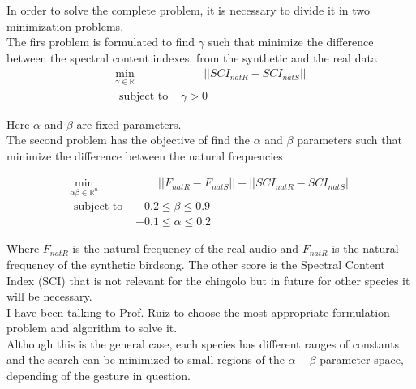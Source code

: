 \documentclass{article}
\begin{document}
    
    In order to solve the complete problem, it is necessary to divide it in two minimization problems.\\
    
    The firs problem is formulated to find $\gamma$ such that minimize the difference between the  spectral content indexes, from the synthetic and the real data
    \begin{equation}
    \begin{aligned}
    \underset{\gamma \in \mathbb{R}}{\text{min}} &\qquad || SCI_{natR} - SCI_{natS}||\\
    \text { subject to } &  \gamma > 0
    \end{aligned}
    \end{equation}
    
    Here $\alpha$ and $\beta$ are fixed parameters.\\
    
    The second problem has the objective of find the $\alpha$ and $\beta$ parameters such that minimize the difference between the natural frequencies
    
    \begin{equation}
    \begin{aligned}
    \underset{\alpha \beta \in \mathbb{R}^n}{\text{min}} &\qquad || F_{natR} - F_{natS}|| + || SCI_{natR} - SCI_{natS}||\\
    \text { subject to } & -0.2\leq\beta \leq 0.9\\
     & -0.1 \leq \alpha \leq 0.2
    \end{aligned}
    \end{equation}
    
    
    Where $F_{natR}$ is the natural frequency of the real audio and $F_{natR}$ is the natural frequency of the synthetic birdsong. The other score is the Spectral Content Index (SCI) that is not relevant for the chingolo but in future for other species it will be necessary.\\
    
    
    
    I have been talking to Prof. Ruiz to choose the most appropriate  formulation problem and algorithm to solve it.\\
    
    
    Although this is the general case, each species has different ranges of constants and the search can be minimized to small regions of the $\alpha - \beta$ parameter space, depending of the gesture in question.  \\
    
\end{document}
